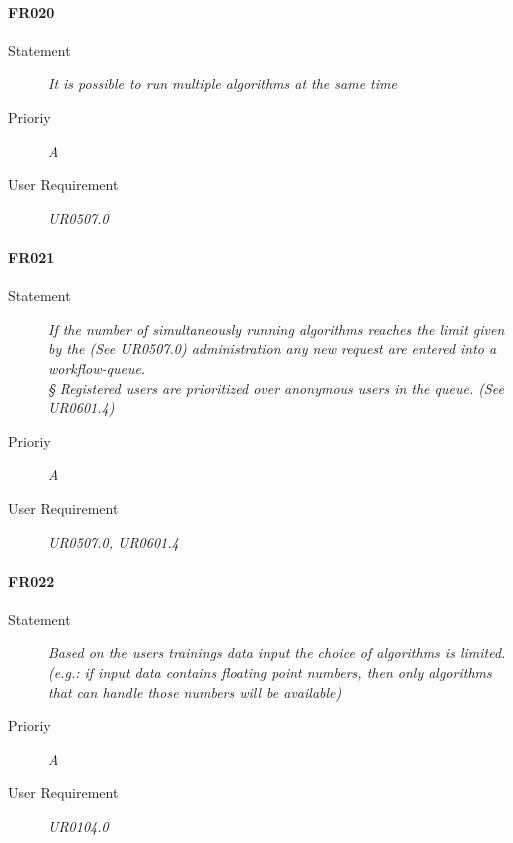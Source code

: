 \paragraph{FR020}
\begin{description}
  \item [Statement]
    \textit{
It is possible to run multiple algorithms at the same time
}
  \item [Prioriy] \textit{A}
  \item[User Requirement] \textit{UR0507.0}
\end{description}

\paragraph{FR021}
\begin{description}
  \item [Statement]
    \textit{
If the number of simultaneously running algorithms reaches the limit given by the (See UR0507.0) administration any new request are entered into a workflow-queue.
\\§  Registered users are prioritized over anonymous users in the queue. (See UR0601.4)
}
  \item [Prioriy] \textit{A}
   \item[User Requirement] \textit{UR0507.0, UR0601.4}
\end{description}

\paragraph{FR022}
\begin{description}
  \item [Statement]
    \textit{
Based on the users trainings data input the choice of algorithms is limited. (e.g.: if input data  contains floating point numbers, then only algorithms that can handle those numbers will be available)
}
  \item [Prioriy] \textit{A}
  \item[User Requirement] \textit{UR0104.0}
\end{description}
